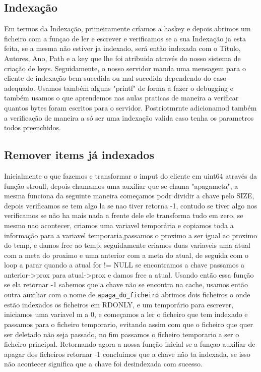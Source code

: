 \documentclass{llncs}
\begin{document}
\subsection{Indexação}
Em termos da Indexação, primeiramente críamos a haskey  
e depois abrimos um ficheiro com a funçao de ler e escrever e verificamos se a sua Indexação ja esta feita, se a mesma não estiver ja indexado, será então indexada com o Titulo, Autores, Ano, Path e a key que lhe foi atribuida através do nosso sistema de criação de keys.
Seguidamente, o nosso servidor manda uma mensagem para o cliente de indexação bem sucedida ou mal sucedida dependendo do caso adequado. Usamos também alguns "printf" de forma a fazer o debugging e também usamos o que aprendemos nas aulas praticas de maneira a verificar quantos bytes foram escritos para o servidor. Postriotmrnte adicionamod também a verificação de maneira a só
ser uma indexação valida caso tenha os parametros todos preenchidos.

\subsection{Remover items já indexados}
Inicialmente o que fazemos e transformar o imput do cliente em uint64 através da função stroull, depois chamamos uma auxiliar que se chama "apagameta", a mesma funciona da seguinte maneira começamos podr dividir a chave pelo SIZE, depois verificamos se tem algo la se nao tiver retorna -1, contudo se tiver algo nos verificamos se não ha mais nada a frente dele ele transforma tudo em zero, se 
mesmo nao acontecer, criamos uma variavel temporária e copiamos toda a informação para a variavel temporaria,passamos o proximo a ser igual ao proximo do temp, e damos free ao temp, seguidamente criamos duas variaveis uma atual com a meta do proximo e uma anterior com a meta do atual, de seguida com o loop a parar quando a atual for != NULL se encontramos a chave passamos a anterior->prox para atual->prox e damos free a atual.
Usando então essa função se ela retornar -1 sabemos que a chave não se encontra na cache, usamos então outra auxiliar com o nome de \texttt{apaga\_do\_ficheiro} abrimos dois ficheiros o onde estão indexados os ficheiros em RDONLY, e um temporário para escrever, iniciamos uma variavel m a 0, e começamos a ler o ficheiro que tem indexado e passamos para o ficheiro temporario, evitando assim com que o ficheiro que quer ser deletado não seja passado, no fim passamos o ficheiro temporario a ser o ficheiro principal.
Retornando agora a nossa função inicial  se a funçao auxiliar de apagar dos ficheiros retornar -1 concluimos que a chave não ta indexada, se isso não acontecer significa que a chave foi desindexada com sucesso.
\end{document}
